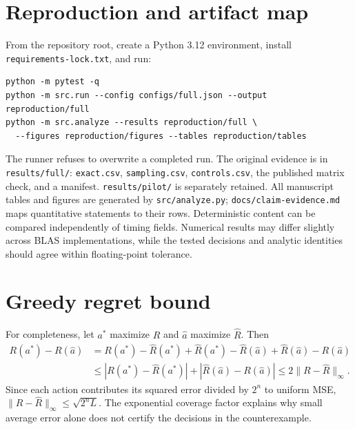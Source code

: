 \documentclass[10pt]{article}
\begin{document}



\appendix
\section{Reproduction and artifact map}
From the repository root, create a Python 3.12 environment, install \texttt{requirements-lock.txt}, and run:
\begin{verbatim}
python -m pytest -q
python -m src.run --config configs/full.json --output reproduction/full
python -m src.analyze --results reproduction/full \
  --figures reproduction/figures --tables reproduction/tables
\end{verbatim}
The runner refuses to overwrite a completed run. The original evidence is in \texttt{results/full/}: \texttt{exact.csv}, \texttt{sampling.csv}, \texttt{controls.csv}, the published matrix check, and a manifest. \texttt{results/pilot/} is separately retained. All manuscript tables and figures are generated by \texttt{src/analyze.py}; \texttt{docs/claim-evidence.md} maps quantitative statements to their rows. Deterministic content can be compared independently of timing fields. Numerical results may differ slightly across BLAS implementations, while the tested decisions and analytic identities should agree within floating-point tolerance.

\section{Greedy regret bound}
For completeness, let $a^*$ maximize $R$ and $\widehat a$ maximize $\widehat R$. Then
\begin{align*}
 R(a^*)-R(\widehat a)
 &=R(a^*)-\widehat R(a^*)+\widehat R(a^*)-\widehat R(\widehat a)
   +\widehat R(\widehat a)-R(\widehat a)\\
 &\leq |R(a^*)-\widehat R(a^*)|+|\widehat R(\widehat a)-R(\widehat a)|
 \leq2\|R-\widehat R\|_\infty.
\end{align*}
Since each action contributes its squared error divided by $2^n$ to uniform MSE, $\|R-\widehat R\|_\infty\leq\sqrt{2^nL}$. The exponential coverage factor explains why small average error alone does not certify the decisions in the counterexample.
\end{document}
